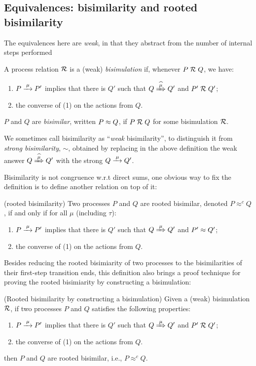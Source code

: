 \subsection{Equivalences: bisimilarity and rooted bisimilarity}
\label{ss:BiEx}

The equivalences here are 
 \emph{weak}, in that they
abstract from the number of internal steps performed
\begin{definition}[bisimilarity]
\label{d:wb}
A process relation ${{\cal R}}$ 
 is a (weak) \emph{bisimulation} if, whenever
 $P\mathrel{\cal R} Q$, %
we have:
\begin{enumerate}
\item 
    $P \arr\mu P'$   implies that there is $Q'$ such that $Q \Arcap \mu Q'$ and $P' \mathrel{\cal R} Q'$;
\item the converse of (1)
 on the actions from $Q$.
\end{enumerate}  
 $P$ and $Q$ are \emph{bisimilar},
written $P \approx
 Q$, if $P \mathrel{\cal R} Q$ for some  bisimulation ${\cal R}$.  
\end{definition} 

We sometimes call bisimilarity as ``\emph{weak} bisimilarity'', to
distinguish it from \emph{strong bisimilarity}, $\sim$,
obtained by replacing in the above definition   the weak answer $
Q\Arcap\mu Q'$ with the strong  $Q \arr \mu Q'$.

Bisimilarity is not congruence w.r.t direct sums, one obvious way to
fix the definition is to define another relation on top of it:
\begin{definition}{(rooted bisimilarity)}
Two processes $P$ and $Q$ are rooted bisimilar, denoted $P
\approx^c Q$, if and only if for all $\mu$ (including $\tau$):
\begin{enumerate}
 \item  $P \arr\mu P'$ implies that there is $Q'$ such that $Q
   \Arr\mu Q'$ and $P' \approx Q'$;
\item the converse of (1) on the actions from $Q$.
\end{enumerate}
\end{definition}
Besides reducing the rooted bisimiarity of two processes to
the bisimilarities of their first-step transition ends, this definition also brings a proof technique for proving the
rooted bisimiarity by constructing a bisimulation:
\begin{lemma}{(Rooted bisimilarity by constructing a bisimulation)}
\label{l:obsCongrByWeakBisim}
Given a (weak) bisimulation $\mathrel{\cal R}$, if two processes $P$ and $Q$
satisfies the following properties:
\begin{enumerate}
 \item  $P \arr\mu P'$ implies that there is $Q'$ such that $Q
   \Arr\mu Q'$ and $P' \mathrel{\cal R} Q'$;
\item the converse of (1) on the actions from $Q$.
\end{enumerate}
then $P$ and $Q$ are rooted bisimilar, i.e., $P \approx^c Q$.
\end{lemma}

